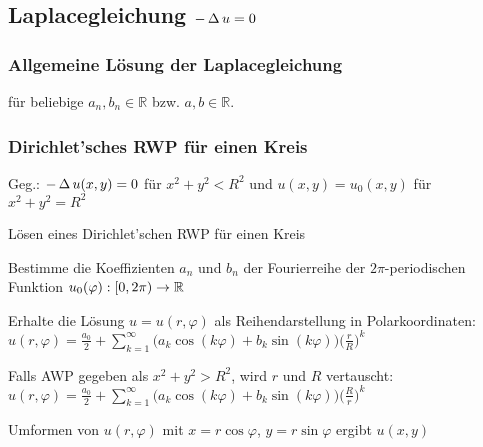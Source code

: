 \documentclass[german,color,5pt]{latex4ei/latex4ei_fs}
\begin{document}
\begin{sectionbox}
	\subsection{Laplacegleichung \quad $-\operatorname{\Delta} u=0$}
	\subsubsection{Allgemeine Lösung der Laplacegleichung}
	für beliebige $a_{n},b_{n} \in \mathbb{R}$ bzw. $a,b \in \mathbb{R}$.
	\subsubsection{Dirichlet'sches RWP für einen Kreis}
	Geg.: $-\operatorname{\Delta} u(x,y)=0$ für $x^2+y^2<R^2$ und $u(x,y)=u_0(x,y)$ für $x^2+y^2=R^2$
	\begin{cookbox}{Lösen eines Dirichlet'schen RWP für einen Kreis}
		\item Bestimme die Koeffizienten $a_n$ und $b_n$ der Fourierreihe der $2\pi$-periodischen Funktion $u_0(\varphi):[0,2\pi)\rightarrow \operatorname{\mathbb R}$
		\item Erhalte die Lösung $u=u(r,\varphi)$ als Reihendarstellung in Polarkoordinaten:\\
		$u(r,\varphi)=\frac{a_0}{2}+\sum_{k=1}^{\infty}\bigl(a_k \cos(k\varphi)+b_k \sin(k\varphi)\bigr)\big(\frac{r}{R}\big)^k$
		\item Falls AWP gegeben als $x^2+y^2>R^2$, wird $r$ und $R$ vertauscht:\\
		$u(r,\varphi)=\frac{a_0}{2}+\sum_{k=1}^{\infty}\bigl(a_k \cos(k\varphi)+b_k \sin(k\varphi)\bigr)\big(\frac{R}{r}\big)^k$
		\item Umformen von $u(r,\varphi)$ mit $x=r\cos\varphi$, $y=r\sin\varphi$ ergibt $u(x,y)$
	\end{cookbox}

\end{sectionbox}
\end{document}
